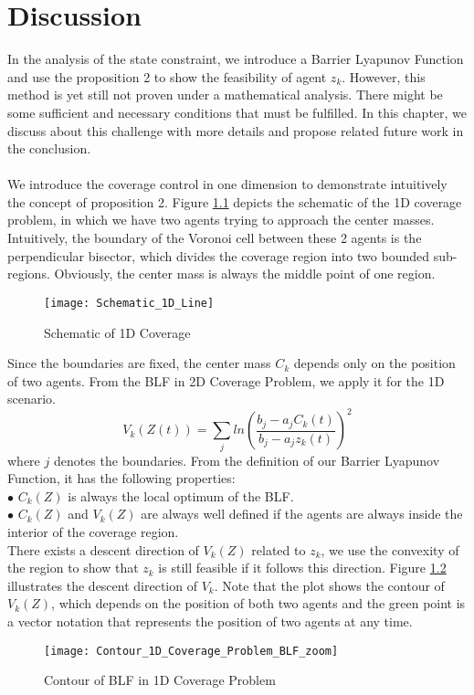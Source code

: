 \chapter{Discussion}
In the analysis of the state constraint, we introduce a Barrier Lyapunov Function and use the proposition 2 to show the feasibility of agent $z_k$. However, this method is yet still not proven under a mathematical analysis. There might be some sufficient and necessary conditions that must be fulfilled. In this chapter, we discuss about this challenge with more details and propose related future work in the conclusion. \\ \\
\noindent We introduce the coverage control in one dimension to demonstrate intuitively the concept of proposition 2. Figure \ref{fig:Schematic_1D} depicts the schematic of the 1D coverage problem, in which we have two agents trying to approach the center masses. Intuitively, the boundary of the Voronoi cell between these 2 agents is the perpendicular bisector, which divides the coverage region into two bounded sub-regions. Obviously, the center mass is always the middle point of one region.
\begin{figure} [!h]
	\centering
	\texttt{[image: Schematic\_1D\_Line]}
	\caption{Schematic of 1D Coverage}
	\label{fig:Schematic_1D}
\end{figure}

\noindent Since the boundaries are fixed, the center mass $C_k$ depends only on the position of two agents. From the BLF in 2D Coverage Problem, we apply it for the 1D scenario.
\begin{equation}
V_k(Z(t)) = \displaystyle\sum_{j}^{} ln(\frac{b_j - a_jC_k(t)}{b_j - a_{j}z_{k}(t)})^2
\end{equation} 
where $j$ denotes the boundaries. From the definition of our Barrier Lyapunov Function, it has the following properties: \\
$\bullet$ $C_k(Z)$ is always the local optimum of the BLF. \\
$\bullet$ $C_k(Z)$ and $V_k(Z)$ are always well defined if the agents are always inside the interior of the coverage region. \\
There exists a descent direction of $V_k(Z)$ related to $z_k$, we use the convexity of the region to show that $z_k$ is still feasible if it follows this direction. Figure \ref{fig:BLF_2D_1} illustrates the descent direction of $V_k$. Note that the plot shows the contour of $V_k(Z)$, which depends on the position of both two agents and the green point is a vector notation that represents the position of two agents at any time.
\begin{figure} [!h]
	\centering
	\texttt{[image: Contour\_1D\_Coverage\_Problem\_BLF\_zoom]}
	\caption{Contour of BLF in 1D Coverage Problem}
	\label{fig:BLF_2D_1}
\end{figure}

